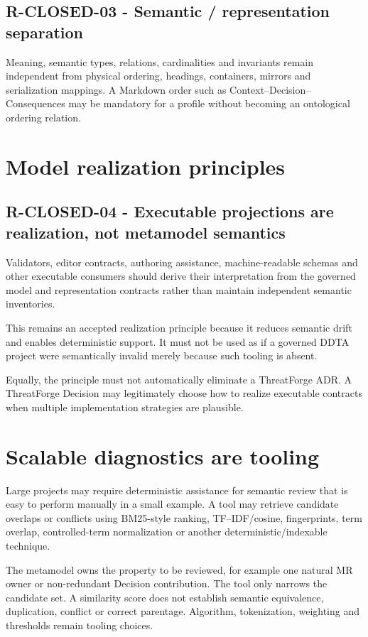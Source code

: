 \documentclass[11pt,a4paper]{article}
\begin{document}
\subsection*{R-CLOSED-03 - Semantic / representation separation}
Meaning, semantic types, relations, cardinalities and invariants remain independent from physical ordering, headings, containers, mirrors and serialization mappings. A Markdown order such as Context--Decision--Consequences may be mandatory for a profile without becoming an ontological ordering relation.

\section{Model realization principles}
\subsection*{R-CLOSED-04 - Executable projections are realization, not metamodel semantics}
Validators, editor contracts, authoring assistance, machine-readable schemas and other executable consumers should derive their interpretation from the governed model and representation contracts rather than maintain independent semantic inventories.

This remains an accepted realization principle because it reduces semantic drift and enables deterministic support. It must not be used as if a governed DDTA project were semantically invalid merely because such tooling is absent.

Equally, the principle must not automatically eliminate a ThreatForge ADR. A ThreatForge Decision may legitimately choose how to realize executable contracts when multiple implementation strategies are plausible.

\section{Scalable diagnostics are tooling}
Large projects may require deterministic assistance for semantic review that is easy to perform manually in a small example. A tool may retrieve candidate overlaps or conflicts using BM25-style ranking, TF--IDF/cosine, fingerprints, term overlap, controlled-term normalization or another deterministic/indexable technique.

The metamodel owns the property to be reviewed, for example one natural MR owner or non-redundant Decision contribution. The tool only narrows the candidate set. A similarity score does not establish semantic equivalence, duplication, conflict or correct parentage. Algorithm, tokenization, weighting and thresholds remain tooling choices.
\end{document}
